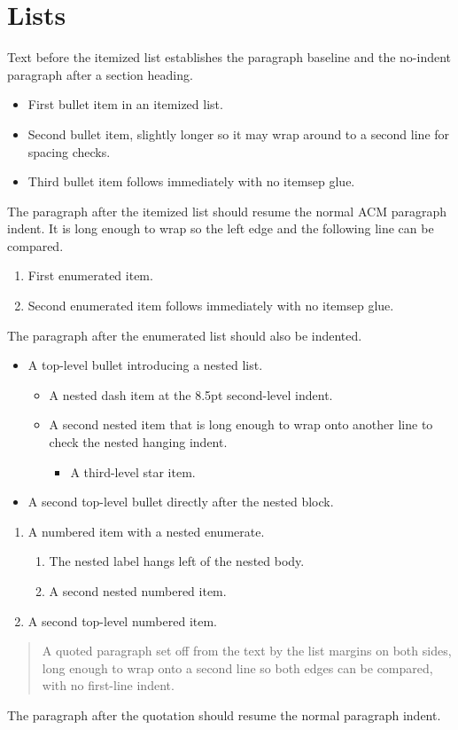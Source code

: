 \documentclass[acmsmall]{acmart}
\begin{document}
\thispagestyle{empty}

\section{Lists}
Text before the itemized list establishes the paragraph baseline and the
no-indent paragraph after a section heading.

\begin{itemize}
\item First bullet item in an itemized list.
\item Second bullet item, slightly longer so it may wrap around to a second line
  for spacing checks.
\item Third bullet item follows immediately with no itemsep glue.
\end{itemize}

The paragraph after the itemized list should resume the normal ACM paragraph
indent. It is long enough to wrap so the left edge and the following line can be
compared.

\begin{enumerate}
\item First enumerated item.
\item Second enumerated item follows immediately with no itemsep glue.
\end{enumerate}

The paragraph after the enumerated list should also be indented.

\begin{itemize}
\item A top-level bullet introducing a nested list.
  \begin{itemize}
  \item A nested dash item at the 8.5pt second-level indent.
  \item A second nested item that is long enough to wrap onto another line to
    check the nested hanging indent.
    \begin{itemize}
    \item A third-level star item.
    \end{itemize}
  \end{itemize}
\item A second top-level bullet directly after the nested block.
\end{itemize}

\begin{enumerate}
\item A numbered item with a nested enumerate.
  \begin{enumerate}
  \item The nested label hangs left of the nested body.
  \item A second nested numbered item.
  \end{enumerate}
\item A second top-level numbered item.
\end{enumerate}

\begin{quote}
A quoted paragraph set off from the text by the list margins on both sides,
long enough to wrap onto a second line so both edges can be compared, with no
first-line indent.
\end{quote}

The paragraph after the quotation should resume the normal paragraph indent.
\end{document}
